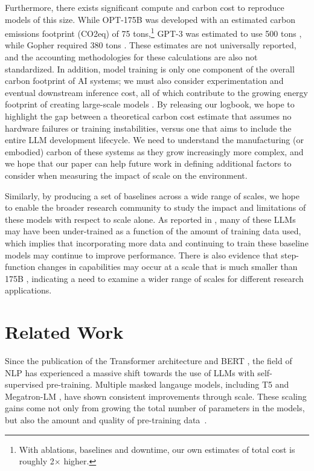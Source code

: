 Furthermore, there exists significant compute and carbon cost to reproduce models of this size.  While {OPT-175B} was developed with an estimated carbon emissions footprint (CO2eq) of 75 tons,\footnote{With ablations, baselines and downtime, our own estimates of total cost is roughly 2$\times$ higher.} {GPT-3} was estimated to use 500 tons \cite{patterson2021carbon}, while Gopher required 380 tons \cite{gopher2022}.  These estimates are not universally reported, and the accounting methodologies for these calculations are also not standardized. In addition, model training is only one component of the overall carbon footprint of AI systems; we must also consider experimentation and eventual downstream inference cost, all of which contribute to the growing energy footprint of creating large-scale models \cite{sustainable_ai2021}.  By releasing our logbook, we hope to highlight the gap between a theoretical carbon cost estimate that assumes no hardware failures or training instabilities, versus one that aims to include the entire LLM development lifecycle.  We need to understand the manufacturing (or embodied) carbon of these systems \cite{gupta2021chasing} as they grow increasingly more complex, and we hope that our paper can help future work in defining additional factors to consider when measuring the impact of scale on the environment.

Similarly, by producing a set of baselines across a wide range of scales, we hope to enable the broader research community to study the impact and limitations of these models with respect to scale alone. As reported in \citet{chinchilla2022}, many of these LLMs may have been under-trained as a function of the amount of training data used, which implies that incorporating more data and continuing to train these baseline models may continue to improve performance.  There is also evidence that step-function changes in capabilities may occur at a scale that is much smaller than 175B \cite{flan2021}, indicating a need to examine a wider range of scales for different research applications.

\section{Related Work}
\label{sec:related_work}

Since the publication of the Transformer architecture \cite{vaswani2017attention} and BERT \cite{devlin2018bert}, the field of NLP has experienced a massive shift towards the use of LLMs with self-supervised pre-training. Multiple masked langauge models, including T5 \cite{raffel2020exploring} and Megatron-LM \cite{shoeybi2019megatron}, have shown consistent improvements through scale. These scaling gains come not only from growing the total number of parameters in the models, but also the amount and quality of pre-training data~\cite{liu2019roberta,chinchilla2022}.  

